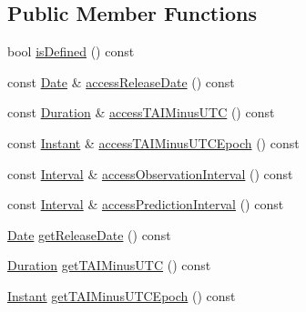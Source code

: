 \subsection*{Public Member Functions}
\begin{DoxyCompactItemize}
\item 
bool \hyperlink{classostk_1_1physics_1_1coord_1_1frame_1_1provider_1_1iers_1_1_bulletin_a_a99d2ad4ccaa884ee8f2d99ef805b072e}{is\+Defined} () const
\item 
const \hyperlink{classostk_1_1physics_1_1time_1_1_date}{Date} \& \hyperlink{classostk_1_1physics_1_1coord_1_1frame_1_1provider_1_1iers_1_1_bulletin_a_af4ca9cf1618b762a58bdd164b3f79160}{access\+Release\+Date} () const
\item 
const \hyperlink{classostk_1_1physics_1_1time_1_1_duration}{Duration} \& \hyperlink{classostk_1_1physics_1_1coord_1_1frame_1_1provider_1_1iers_1_1_bulletin_a_a1c8c5e2eb4837c7a70b37ea93a9c17f0}{access\+T\+A\+I\+Minus\+U\+TC} () const
\item 
const \hyperlink{classostk_1_1physics_1_1time_1_1_instant}{Instant} \& \hyperlink{classostk_1_1physics_1_1coord_1_1frame_1_1provider_1_1iers_1_1_bulletin_a_a5b6825e678de348762a7c3a5d925237b}{access\+T\+A\+I\+Minus\+U\+T\+C\+Epoch} () const
\item 
const \hyperlink{classostk_1_1physics_1_1time_1_1_interval}{Interval} \& \hyperlink{classostk_1_1physics_1_1coord_1_1frame_1_1provider_1_1iers_1_1_bulletin_a_aaef82b98b08ef2be421127ce3b8e2212}{access\+Observation\+Interval} () const
\item 
const \hyperlink{classostk_1_1physics_1_1time_1_1_interval}{Interval} \& \hyperlink{classostk_1_1physics_1_1coord_1_1frame_1_1provider_1_1iers_1_1_bulletin_a_a37d538195a830e834f9021c7af608068}{access\+Prediction\+Interval} () const
\item 
\hyperlink{classostk_1_1physics_1_1time_1_1_date}{Date} \hyperlink{classostk_1_1physics_1_1coord_1_1frame_1_1provider_1_1iers_1_1_bulletin_a_add1754f08534bf855e8a30a0e9a02644}{get\+Release\+Date} () const
\item 
\hyperlink{classostk_1_1physics_1_1time_1_1_duration}{Duration} \hyperlink{classostk_1_1physics_1_1coord_1_1frame_1_1provider_1_1iers_1_1_bulletin_a_a88839dec09a59ea329c6a96ef7c078cd}{get\+T\+A\+I\+Minus\+U\+TC} () const
\item 
\hyperlink{classostk_1_1physics_1_1time_1_1_instant}{Instant} \hyperlink{classostk_1_1physics_1_1coord_1_1frame_1_1provider_1_1iers_1_1_bulletin_a_aec36583bb25cd4ef984b1a36886b2fe1}{get\+T\+A\+I\+Minus\+U\+T\+C\+Epoch} () const

\end{DoxyCompactItemize}

